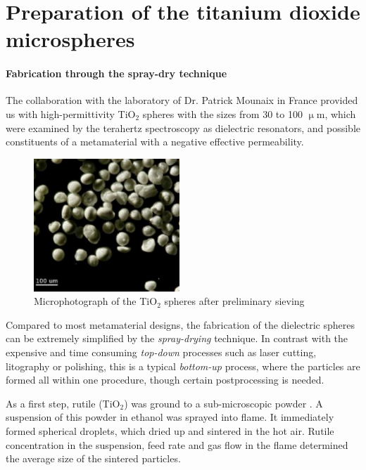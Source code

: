 
\section{Preparation of the titanium dioxide microspheres}
\paragraph{Fabrication through the spray-dry technique}%
The collaboration with the laboratory of Dr. Patrick Mounaix in France %
provided us with high-permittivity TiO$_{2}$ spheres with the sizes from 30 to 100 $\upmu$m, which were examined by the terahertz spectroscopy as dielectric resonators, and possible constituents of a metamaterial with a negative effective permeability.
\begin{figure}[ht] \caption{Microphotograph of the TiO$_{2}$ spheres after preliminary sieving} \label{fg_microphoto} \centering 
\includegraphics[height=5cm]{img/microscope_TiO2_particles.pdf}
\end{figure}

Compared to most metamaterial designs, the fabrication of the dielectric spheres can be extremely simplified by the \textit{spray-drying} technique. In contrast with the expensive and time consuming \textit{top-down} processes such as laser cutting, litography or polishing, this is a typical \textit{bottom-up} process, where the particles are formed all within one procedure, though certain postprocessing is needed. 

As a first step, rutile (TiO$_{2}$) was ground to a sub-microscopic powder \cite[pp. 91-93]{yahiaoui2011phd}. A suspension of this powder in ethanol was sprayed into flame. It immediately formed spherical droplets, which dried up and sintered in the hot air. Rutile concentration in the suspension, feed rate and gas flow in the flame determined the average size of the sintered particles.

